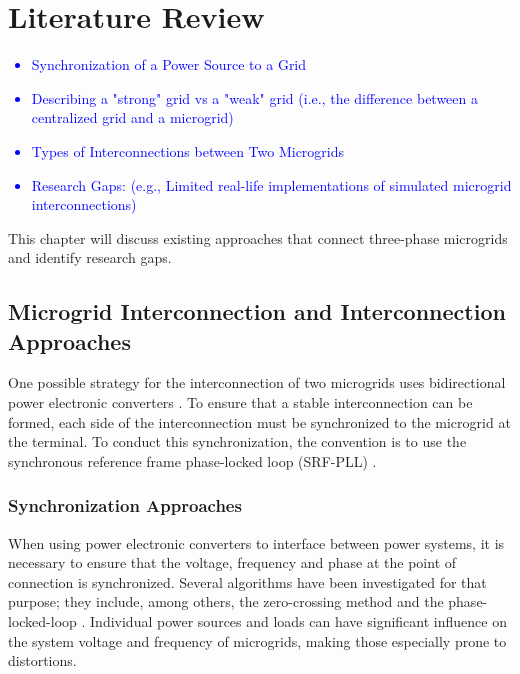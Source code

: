 \chapter{Literature Review}

\textcolor{blue}{
\begin{itemize}
    \item Synchronization of a Power Source to a Grid
    \item Describing a "strong" grid vs a "weak" grid (i.e., the difference between a centralized grid and a microgrid)
    \item Types of Interconnections between Two Microgrids
    \item Research Gaps: (e.g., Limited real-life implementations of simulated microgrid interconnections)
\end{itemize}
}

This chapter will discuss existing approaches that connect three-phase microgrids and identify research gaps.



\section{Microgrid Interconnection and Interconnection Approaches}

One possible strategy for the interconnection of two microgrids uses bidirectional power electronic converters \cite{Blaabjerg_Grid_Synchronization}. To ensure that a stable interconnection can be formed, each side of the interconnection must be synchronized to the microgrid at the terminal. To conduct this synchronization, the convention is to use the synchronous reference frame phase-locked loop (SRF-PLL) \cite{Guerrero_Vasquez_3PLL}.

\subsection{Synchronization Approaches}

When using power electronic converters to interface between power systems, it is necessary to ensure that the voltage, frequency and phase at the point of connection is synchronized. Several algorithms have been investigated for that purpose; they include, among others, the zero-crossing method and the phase-locked-loop \cite{Blaabjerg_Grid_Synchronization}. Individual power sources and loads can have significant influence on the system voltage and frequency of microgrids, making those especially prone to distortions.

